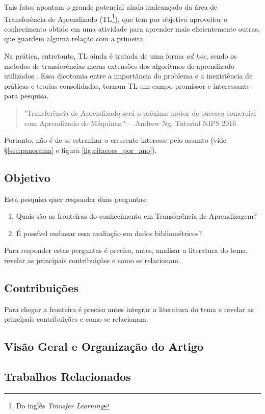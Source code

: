 \documentclass[sigconf]{acmart}
\begin{document}
  Tais fatos apontam  o grande potencial ainda inalcançado da área de Transferência de Aprendizado (TL\footnote{Do inglês \emph{Transfer Learning}}), que tem por objetivo aproveitar o conhecimento obtido em uma atividade para aprender mais eficientemente outras, que guardem alguma relação com a primeira.
  
  Na prática, entretanto, TL ainda é tratada de uma forma \textit{ad hoc}, sendo os métodos de transferências meras extensões dos algoritmos de aprendizado utilizados \cite{torrey}. Essa dicotomia entre a importância do problema e a inexistência de práticas e teorias consolidadas, tornam TL um campo promissor e interessante para pesquisa. 
  
  \begin{quote} "Transferência de Aprendizado será o próximo motor do sucesso comercial com Aprendizado de Máquinas." \hfill ---Andrew Ng, Tutorial NIPS 2016 \cite{ANg}
  \end{quote}

  Portanto, não é de se estranhar o crescente interesse pelo assunto (vide \S\ref{sec:panorama} e figura \ref{fig:citacoes_por_ano}).  

  \subsection{Objetivo}
   Esta pesquisa quer responder duas perguntas:
    \begin{enumerate}
      \item{Quais são as fronteiras do conhecimento em Transferência de Aprendizagem?}
      \item {É possível embasar essa avaliação em dados bibliométricos?}
    \end{enumerate}
    Para responder estas perguntas é preciso, antes, analisar a literatura do tema, revelar as principais contribuições e como se relacionam.
  
  \subsection{Contribuições}
    Para chegar a fronteira é preciso antes integrar a literatura do tema e revelar as principais contribuições e como se relacionam.
    \lipsum[3]
  
  \subsection{Visão Geral e Organização do Artigo}
  \lipsum[3]
  \subsection{Trabalhos Relacionados}
  \lipsum[2]
\end{document}
